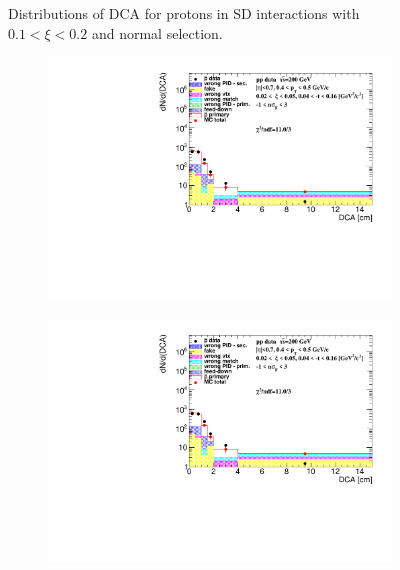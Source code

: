 \begin{figure}[h!]
\begin{subfigure}{.45\textwidth}
	\end{subfigure}
	\caption{Distributions of DCA for protons in SD interactions with $0.1< \xi<0.2$ and normal selection.}
	\label{fig:dca_proton_2t}
\end{figure}
\begin{figure}[h!]
	\centering
	\begin{subfigure}{.45\textwidth}
		\includegraphics[width=\linewidth, page=1]{chapters/chrgSTAR/img/DCAproton/background_p_bar_0.pdf}
	\end{subfigure}
	\begin{subfigure}{.45\textwidth}
		\includegraphics[width=\linewidth, page=2]{chapters/chrgSTAR/img/DCAproton/background_p_bar_0.pdf}
	\end{subfigure}
	\begin{subfigure}{.45\textwidth}

\end{subfigure}
\end{figure}
